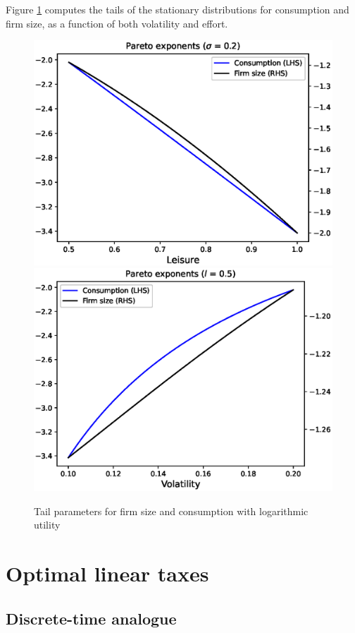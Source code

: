 \documentclass[11pt]{article}
\theoremstyle{plain}
\begin{document}
Figure \ref{fig:tails_log} computes the tails of the stationary distributions for consumption and firm size, as a function of both volatility and effort. 

\begin{figure}[H]
\centering
\includegraphics[width=0.49\linewidth]{tails_log}
\includegraphics[width=0.49\linewidth]{tails_sig_log}
\caption{Tail parameters for firm size and consumption with logarithmic utility}\label{fig:tails_log}
\end{figure}


\section{Optimal linear taxes}

\subsection{Discrete-time analogue} \label{discCE} 
\end{document}
